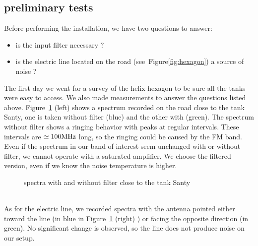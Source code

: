 \subsection{preliminary tests}
Before performing the installation, we have two questions to answer:
\begin{itemize}
\item is the input filter necessary ?
\item    is    the    electric    line    located    on    the    road
  (see~Figure\ref{fig:hexagon}) a source of noise ?
\end{itemize}
The first day we went for a survey of the helix hexagon to be sure all
the tanks were easy to access. We also made measurements to answer the
questions  listed  above.    Figure~\ref{fig:filter}  (left)  shows  a
spectrum recorded  on the road close  to the tank Santy,  one is taken
without filter (blue) and the other with (green). The spectrum without
filter  shows a  ringing  behavior with  peaks  at regular  intervals.
These intervals are $\rm \simeq  100MHz$ long, so the ringing could be
caused by the  FM band.  Even if the spectrum in  our band of interest
seem  unchanged with  or  without  filter, we  cannot  operate with  a
saturated amplifier. We  choose the filtered version, even  if we know
the noise temperature is higher.
\begin{figure}[ht!]
  \centering
  \hspace*{-3ex}
  \caption{spectra with and without filter close to the tank Santy}
  \label{fig:filter}
\end{figure}
\\As  for the  electric line,  we  recorded spectra  with the  antenna
pointed  either toward  the line  (in blue  in Figure~\ref{fig:filter}
(right) ) or facing the  opposite direction (in green). No significant
change is observed, so the line does not produce noise on our setup.
\clearpage
